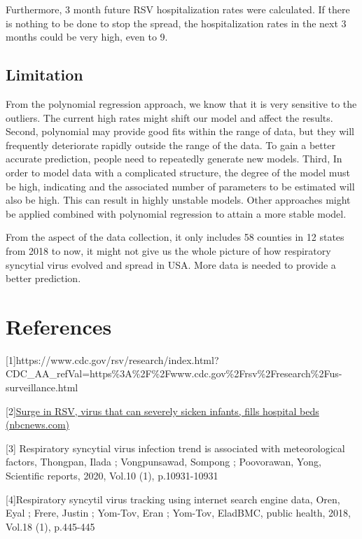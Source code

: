 \documentclass[
  letterpaper,
  DIV=11,
  numbers=noendperiod]{scrreport}
\begin{document}
Furthermore, 3 month future RSV hospitalization rates were calculated.
If there is nothing to be done to stop the spread, the hospitalization
rates in the next 3 months could be very high, even to 9.

\hypertarget{limitation}{%
\section{Limitation}\label{limitation}}

From the polynomial regression approach, we know that it is very
sensitive to the outliers. The current high rates might shift our model
and affect the results. Second, polynomial may provide good fits within
the range of data, but they will frequently deteriorate rapidly outside
the range of the data. To gain a better accurate prediction, people need
to repeatedly generate new models. Third, In order to model data with a
complicated structure, the degree of the model must be high, indicating
and the associated number of parameters to be estimated will also be
high. This can result in highly unstable models. Other approaches might
be applied combined with polynomial regression to attain a more stable
model.

From the aspect of the data collection, it only includes 58 counties in
12 states from 2018 to now, it might not give us the whole picture of
how respiratory syncytial virus evolved and spread in USA. More data is
needed to provide a better prediction.


\hypertarget{references}{%
\chapter{References}\label{references}}

{[}1{]}https://www.cdc.gov/rsv/research/index.html?CDC\_AA\_refVal=https\%3A\%2F\%2Fwww.cdc.gov\%2Frsv\%2Fresearch\%2Fus-surveillance.html

{[}2{]}\href{https://www.nbcnews.com/health/health-news/surge-rsv-virus-fills-hospitals-can-severely-sicken-babies-rcna52082}{Surge
in RSV, virus that can severely sicken infants, fills hospital beds
(nbcnews.com)}

{[}3{]} Respiratory syncytial virus infection trend is associated with
meteorological factors, Thongpan, Ilada ; Vongpunsawad, Sompong ;
Poovorawan, Yong, Scientific reports, 2020, Vol.10 (1), p.10931-10931

{[}4{]}Respiratory syncytil virus tracking using internet search engine
data, Oren, Eyal ; Frere, Justin ; Yom-Tov, Eran ; Yom-Tov, EladBMC,
public health, 2018, Vol.18 (1), p.445-445
\end{document}
